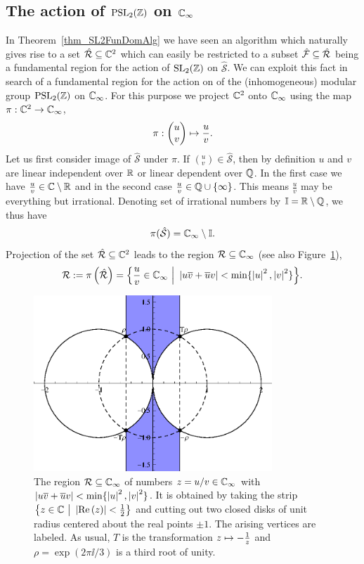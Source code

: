 \subsection{The action of $\operatorname{PSL}_{2}(\mathbb{Z})$ on $\mathbb{C}_{\infty}$}

In Theorem~\ref{thm_SL2FunDomAlg} we have seen an algorithm which naturally gives rise to a set $\hat{\mathcal{R}} \subseteq \mathbb{C}^2$ which can easily be restricted to a subset $\hat{\mathcal{F}} \subseteq \hat{\mathcal{R}}$ being a fundamental region for the action of $\operatorname{SL}_{2}(\mathbb{Z})$ on $\hat{\mathcal{S}}$. We can exploit this fact in search of a fundamental region for the action on of the (inhomogeneous) modular group $\operatorname{PSL}_{2}(\mathbb{Z})$ on $\mathbb{C}_{\infty}$. For this purpose we project $\mathbb{C}^2$ onto $\mathbb{C}_{\infty}$ using the map $\pi : \mathbb{C}^2 \to \mathbb{C}_{\infty}$,
\begin{equation}
\pi : \begin{pmatrix}u \\ v\end{pmatrix} \mapsto \frac{u}{v}.
\end{equation}
Let us first consider image of $\hat{\mathcal{S}}$ under $\pi$. If $({}^u_v) \in \hat{\mathcal{S}}$, then by definition $u$ and $v$ are linear independent over $\mathbb{R}$ or linear dependent over $\mathbb{Q}$. In the first case we have $\frac{u}{v} \in \mathbb{C} \setminus \mathbb{R}$ and in the second case $\frac{u}{v} \in \mathbb{Q} \cup \{\infty\}$. This means $\frac{u}{v}$ may be everything but irrational. Denoting set of irrational numbers by $\mathbb{I} = \mathbb{R} \setminus \mathbb{Q}$, we thus have
\begin{equation*}
\pi(\hat{\mathcal{S}}) = \mathbb{C}_{\infty} \setminus \mathbb{I}.
\end{equation*}
Projection of the set $\hat{\mathcal{R}} \subseteq \mathbb{C}^2$ leads to the region $\mathcal{R} \subseteq \mathbb{C}_{\infty}$ (see also Figure~\ref{fig_PSL2MinRegion}),
\begin{equation}
\label{eqn_PSL2MinRegion}
\mathcal{R} := \pi\left(\hat{\mathcal{R}}\right) = 
\Big\{ \frac{u}{v} \in \mathbb{C}_{\infty} \ \Big| \ \left|u\overline{v} + \overline{u}v\right| < \min\{\left|u\right|^2, \left|v\right|^2\} \Big\}.
\end{equation}
\begin{figure}
\centering
\includegraphics[width=0.8\textwidth]{figures/minimal-region}
\caption{The region $\mathcal{R} \subseteq \mathbb{C}_{\infty}$ of numbers $z = u/v \in \mathbb{C}_{\infty}$ with $\left|u\overline{v} + \overline{u}v\right| < \min\{\left|u\right|^2,\left|v\right|^2\}$. It is obtained by taking the strip $\big\{ z \in \mathbb{C} \ \big| \ \left|\operatorname{Re}\left(z\right)\right| < \frac{1}{2} \big\}$  and cutting out two closed disks of unit radius centered about the real points $\pm 1$. The arising vertices are labeled. As usual, $T$ is the transformation $z \mapsto -\frac{1}{z}$ and $\rho = \exp(2 \pi \ii / 3)$ is a third root of unity.}
\label{fig_PSL2MinRegion}
\end{figure}
